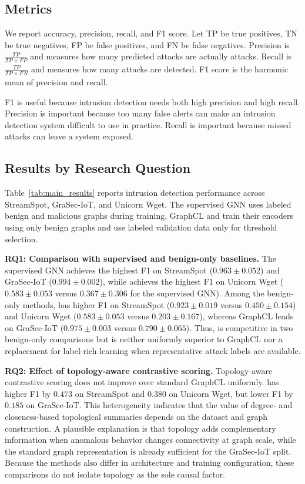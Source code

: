\subsection{Metrics}

We report accuracy, precision, recall, and F1 score. Let TP be true positives, TN be true negatives, FP be false positives, and FN be false negatives. Precision is $\frac{TP}{TP+FP}$ and measures how many predicted attacks are actually attacks. Recall is $\frac{TP}{TP+FN}$ and measures how many attacks are detected. F1 score is the harmonic mean of precision and recall.

F1 is useful because intrusion detection needs both high precision and high recall. Precision is important because too many false alerts can make an intrusion detection system difficult to use in practice. Recall is important because missed attacks can leave a system exposed.

\subsection{Results by Research Question}

Table~\ref{tab:main_results} reports intrusion detection performance across StreamSpot, GraSec-IoT, and Unicorn Wget. The supervised GNN uses labeled benign and malicious graphs during training. GraphCL and \sysname{} train their encoders using only benign graphs and use labeled validation data only for threshold selection.

\noindent\textbf{RQ1: Comparison with supervised and benign-only baselines.}
The supervised GNN achieves the highest F1 on StreamSpot ($0.963 \pm 0.052$) and GraSec-IoT ($0.994 \pm 0.002$), while \sysname{} achieves the highest F1 on Unicorn Wget ($0.583 \pm 0.053$ versus $0.367 \pm 0.306$ for the supervised GNN). Among the benign-only methods, \sysname{} has higher F1 on StreamSpot ($0.923 \pm 0.019$ versus $0.450 \pm 0.154$) and Unicorn Wget ($0.583 \pm 0.053$ versus $0.203 \pm 0.167$), whereas GraphCL leads on GraSec-IoT ($0.975 \pm 0.003$ versus $0.790 \pm 0.065$). Thus, \sysname{} is competitive in two benign-only comparisons but is neither uniformly superior to GraphCL nor a replacement for label-rich learning when representative attack labels are available.

\noindent\textbf{RQ2: Effect of topology-aware contrastive scoring.}
Topology-aware contrastive scoring does not improve over standard GraphCL uniformly. \sysname{} has higher F1 by $0.473$ on StreamSpot and $0.380$ on Unicorn Wget, but lower F1 by $0.185$ on GraSec-IoT. This heterogeneity indicates that the value of degree- and closeness-based topological summaries depends on the dataset and graph construction. A plausible explanation is that topology adds complementary information when anomalous behavior changes connectivity at graph scale, while the standard graph representation is already sufficient for the GraSec-IoT split. Because the methods also differ in architecture and training configuration, these comparisons do not isolate topology as the sole causal factor.

